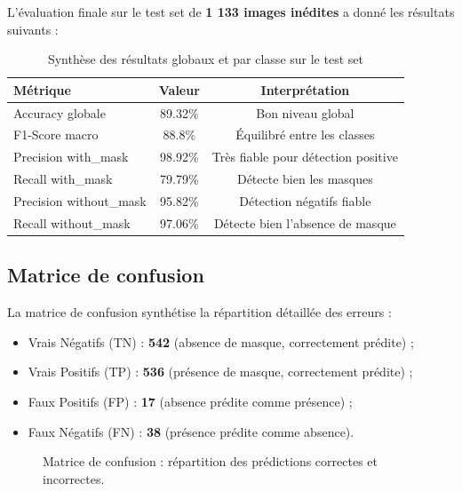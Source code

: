 \documentclass[11pt,a4paper]{article}
\begin{document}
L'évaluation finale sur le test set de \textbf{1 133 images inédites} a donné les résultats suivants :

\begin{table}[H]
\centering
\caption{Synthèse des résultats globaux et par classe sur le test set}
\label{tab:resultats}
\begin{tabular}{lcc}
\toprule
\textbf{Métrique} & \textbf{Valeur} & \textbf{Interprétation} \\
\midrule
Accuracy globale & 89.32\% & Bon niveau global \\
F1-Score macro & 88.8\% & Équilibré entre les classes \\
Precision with\_mask & 98.92\% & Très fiable pour détection positive \\
Recall with\_mask & 79.79\% & Détecte bien les masques \\
Precision without\_mask & 95.82\% & Détection négatifs fiable \\
Recall without\_mask & 97.06\% & Détecte bien l'absence de masque \\
\bottomrule
\end{tabular}
\end{table}

\subsection{Matrice de confusion}

La matrice de confusion synthétise la répartition détaillée des erreurs :
\begin{itemize}
    \item Vrais Négatifs (TN) : \textbf{542} \quad (absence de masque, correctement prédite) ;
    \item Vrais Positifs (TP) : \textbf{536} \quad (présence de masque, correctement prédite) ;
    \item Faux Positifs (FP) : \textbf{17} \quad (absence prédite comme présence) ;
    \item Faux Négatifs (FN) : \textbf{38} \quad (présence prédite comme absence).
\end{itemize}

\begin{figure}[H]
\centering
{}
\caption{Matrice de confusion : répartition des prédictions correctes et incorrectes.}
\label{fig:confusion-matrix}
\end{figure}
\end{document}
